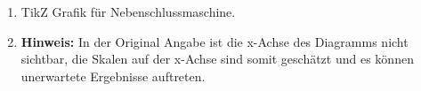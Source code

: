 \begin{solution}
\begin{enumerate}
\item TikZ Grafik f\"ur Nebenschlussmaschine.
\item \textbf{Hinweis:} In der Original Angabe ist die x-Achse des Diagramms nicht sichtbar, die Skalen auf der x-Achse sind somit geschätzt und es k\"onnen unerwartete Ergebnisse auftreten.
\end{enumerate}
\end{solution}